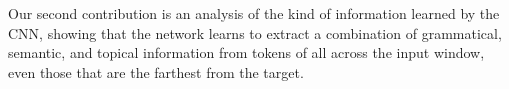 Our second contribution is an analysis of the kind of information
learned by the CNN, showing that the network learns to extract a
combination of grammatical, semantic, and topical information from
tokens of all across the input window, even those that are the
farthest from the target.



